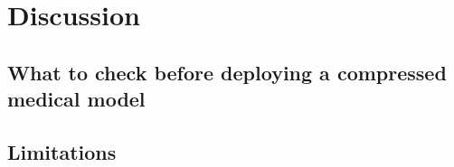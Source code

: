 \section{Discussion}
\label{sec:discussion}

\subsection{What to check before deploying a compressed medical model}

\subsection{Limitations}
